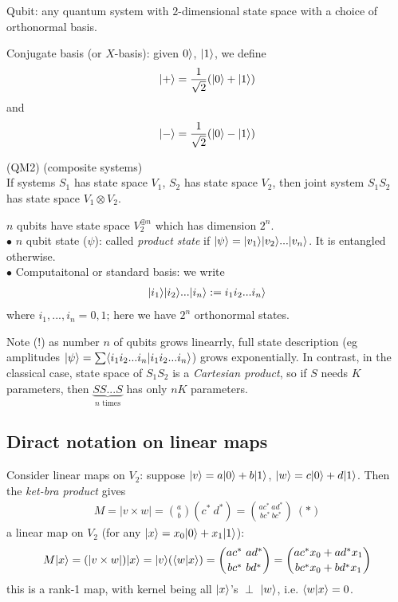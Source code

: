 \documentclass[a4paper]{article}
\begin{document}
Qubit: any quantum system with $2$-dimensional state space with a choice of orthonormal basis.

Conjugate basis (or $X$-basis): given $0\rangle$, $|1\rangle$, we define $$|+\rangle = \frac{1}{\sqrt{2}} (|0\rangle+|1\rangle)$$ and $$|-\rangle = \frac{1}{\sqrt{2}}(|0\rangle-|1\rangle)$$

(QM2) (composite systems)\\
If systems $S_1$ has state space $V_1$, $S_2$ has state space $V_2$, then joint system $S_1S_2$ has state space $V_1 \otimes V_2$.

\begin{eg}
$n$ qubits have state space $V_2^{\oplus n}$ which has dimension $2^n$.\\
$\bullet$ $n$ qubit state ($\psi$): called \emph{product state} if $|\psi \rangle = |v_1 \rangle |v_2 \rangle... |v_n \rangle$. It is entangled otherwise.\\
$\bullet$ Computaitonal or standard basis: we write
\begin{equation*}
\begin{aligned}
|i_1\rangle |i_2\rangle ... |i_n\rangle := i_1i_2...i_n\rangle
\end{aligned}
\end{equation*}
where $i_1,...,i_n = 0,1$; here we have $2^n$ orthonormal states.
\end{eg}

Note (!) as number $n$ of qubits grows linearrly, full state description (eg amplitudes $|\psi\rangle = \sum \langle i_1i_2...i_n | i_1i_2...i_n\rangle$) grows exponentially. In contrast, in the classical case, state space of $S_1S_2$ is a \emph{Cartesian product}, so if $S$ needs $K$ parameters, then $\underbrace{SS...S}_{n \text{ times}}$ has only $nK$ parameters.

\subsection{Diract notation on linear maps}
Consider linear maps on $V_2$: suppose $|v\rangle = a|0\rangle + b|1\rangle$, $|w\rangle = c|0\rangle + d|1\rangle$. Then the \emph{ket-bra product} gives
\begin{equation*}
\begin{aligned}
M = |v \times w| = {a \choose b}(c^* \ d^*) = {{ac^* \ ad^*} \choose {bc^* \ bc^*}} \ (*)
\end{aligned}
\end{equation*}
a linear map on $V_2$ (for any $|x\rangle = x_0 |0\rangle + x_1 |1\rangle$):
\begin{equation*}
\begin{aligned}
M|x\ket = (|v\times w|) |x\ket = |v\ket (\bra w | x \ket) = {{ac^* \ ad^*} \choose {bc^* \ bd^*}} = {ac^*x_0+ad^*x_1 \choose bc^*x_0+bd^*x_1}
\end{aligned}
\end{equation*}
this is a rank-1 map, with kernel being all $|x\rangle$'s $\perp$ $|w\rangle$, i.e. $\langle w | x\rangle = 0$.
\end{document}
